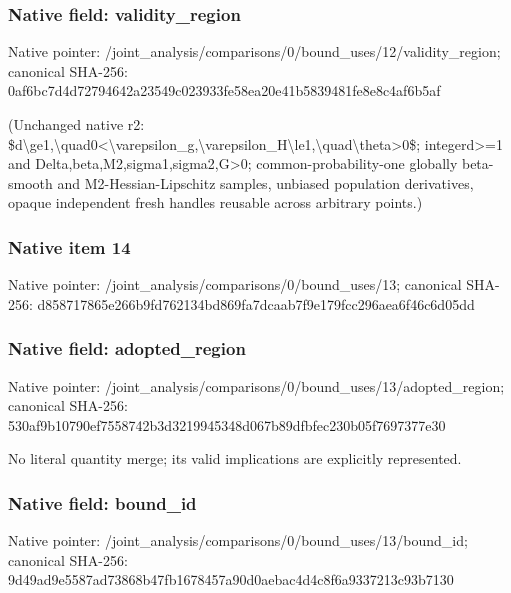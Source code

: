 \documentclass[10pt,a4paper]{article}
\begin{document}
\subsubsection{Native field: validity\_\allowbreak{}region}
Native pointer: /joint\_\allowbreak{}analysis/comparisons/0/bound\_\allowbreak{}uses/12/validity\_\allowbreak{}region; canonical SHA-256: 0af6bc7d4d72794642a23549c023933fe58ea20e41b5839481fe8e8c4af6b5af

\begingroup\raggedright\sloppy (Unchanged native r2:\allowbreak{} \$d\textbackslash{}ge1,\allowbreak{}\textbackslash{}quad0<\textbackslash{}varepsilon\_\allowbreak{}g,\allowbreak{}\textbackslash{}varepsilon\_\allowbreak{}H\textbackslash{}le1,\allowbreak{}\textbackslash{}quad\textbackslash{}theta>0\$;\allowbreak{} integerd>=\allowbreak{}1 and Delta,\allowbreak{}beta,\allowbreak{}M2,\allowbreak{}sigma1,\allowbreak{}sigma2,\allowbreak{}G>0;\allowbreak{} common-probability-one globally beta-smooth and M2-Hessian-Lipschitz samples,\allowbreak{} unbiased population derivatives,\allowbreak{} opaque independent fresh handles reusable across arbitrary points.)\par\endgroup

\subsubsection{Native item 14}
Native pointer: /joint\_\allowbreak{}analysis/comparisons/0/bound\_\allowbreak{}uses/13; canonical SHA-256: d858717865e266b9fd762134bd869fa7dcaab7f9e179fcc296aea6f46c6d05dd

\subsubsection{Native field: adopted\_\allowbreak{}region}
Native pointer: /joint\_\allowbreak{}analysis/comparisons/0/bound\_\allowbreak{}uses/13/adopted\_\allowbreak{}region; canonical SHA-256: 530af9b10790ef7558742b3d3219945348d067b89dfbfec230b05f7697377e30

\begingroup\raggedright\sloppy No literal quantity merge;\allowbreak{} its valid implications are explicitly represented.\par\endgroup

\subsubsection{Native field: bound\_\allowbreak{}id}
Native pointer: /joint\_\allowbreak{}analysis/comparisons/0/bound\_\allowbreak{}uses/13/bound\_\allowbreak{}id; canonical SHA-256: 9d49ad9e5587ad73868b47fb1678457a90d0aebac4d4c8f6a9337213c93b7130
\end{document}
